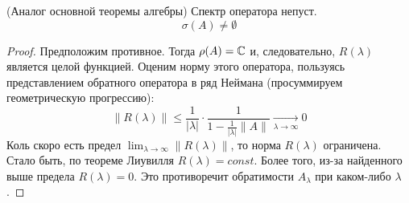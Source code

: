 \begin{proposition} (Аналог основной теоремы алгебры)
	Спектр оператора непуст.
	\[
		\sigma(A) \neq \emptyset
	\]
\end{proposition}

\begin{proof}
	Предположим противное. Тогда $\rho(A) = \mathbb{C}$ и, следовательно, $R(\lambda)$ является целой функцией. Оценим норму этого оператора, пользуясь представлением обратного оператора в ряд Неймана (просуммируем геометрическую прогрессию):
	\[
		\|R(\lambda)\| \le \frac{1}{|\lambda|} \cdot \frac{1}{1 - \frac{1}{|\lambda|}\|A\|} \xrightarrow[\lambda \to \infty]{} 0
	\]
	Коль скоро есть предел $\lim_{\lambda \to \infty} \|R(\lambda)\|$, то норма $R(\lambda)$ ограничена. Стало быть, по теореме Лиувилля $R(\lambda) = const$. Более того, из-за найденного выше предела $R(\lambda) = 0$. Это противоречит обратимости $A_\lambda$ при каком-либо $\lambda$.
\end{proof}

